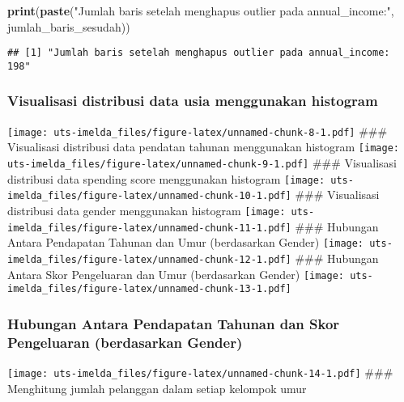 \documentclass[
]{article}
\newenvironment{Shaded}{\begin{snugshade}}{\end{snugshade}}
\newcommand{\FunctionTok}[1]{\textcolor[rgb]{0.13,0.29,0.53}{\textbf{#1}}}
\newcommand{\NormalTok}[1]{#1}
\newcommand{\StringTok}[1]{\textcolor[rgb]{0.31,0.60,0.02}{#1}}
\begin{document}
\begin{Shaded}
\begin{Highlighting}[]
\FunctionTok{print}\NormalTok{(}\FunctionTok{paste}\NormalTok{(}\StringTok{"Jumlah baris setelah menghapus outlier pada annual\_income:"}\NormalTok{, jumlah\_baris\_sesudah))}
\end{Highlighting}
\end{Shaded}

\begin{verbatim}
## [1] "Jumlah baris setelah menghapus outlier pada annual_income: 198"
\end{verbatim}

\hypertarget{visualisasi-distribusi-data-usia-menggunakan-histogram}{%
\subsubsection{Visualisasi distribusi data usia menggunakan
histogram}\label{visualisasi-distribusi-data-usia-menggunakan-histogram}}

\texttt{[image: uts-imelda\_files/figure-latex/unnamed-chunk-8-1.pdf]}
\#\#\# Visualisasi distribusi data pendatan tahunan menggunakan
histogram
\texttt{[image: uts-imelda\_files/figure-latex/unnamed-chunk-9-1.pdf]}
\#\#\# Visualisasi distribusi data spending score menggunakan histogram
\texttt{[image: uts-imelda\_files/figure-latex/unnamed-chunk-10-1.pdf]}
\#\#\# Visualisasi distribusi data gender menggunakan histogram
\texttt{[image: uts-imelda\_files/figure-latex/unnamed-chunk-11-1.pdf]}
\#\#\# Hubungan Antara Pendapatan Tahunan dan Umur (berdasarkan Gender)
\texttt{[image: uts-imelda\_files/figure-latex/unnamed-chunk-12-1.pdf]}
\#\#\# Hubungan Antara Skor Pengeluaran dan Umur (berdasarkan Gender)
\texttt{[image: uts-imelda\_files/figure-latex/unnamed-chunk-13-1.pdf]}

\hypertarget{hubungan-antara-pendapatan-tahunan-dan-skor-pengeluaran-berdasarkan-gender}{%
\subsubsection{Hubungan Antara Pendapatan Tahunan dan Skor Pengeluaran
(berdasarkan
Gender)}\label{hubungan-antara-pendapatan-tahunan-dan-skor-pengeluaran-berdasarkan-gender}}

\texttt{[image: uts-imelda\_files/figure-latex/unnamed-chunk-14-1.pdf]}
\#\#\# Menghitung jumlah pelanggan dalam setiap kelompok umur
\end{document}
